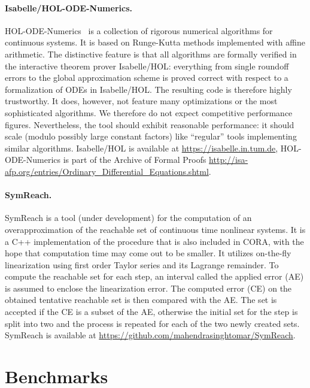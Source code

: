 \documentclass[EPiC]{easychair}
\begin{document}
\paragraph{Isabelle/HOL-ODE-Numerics.}
HOL-ODE-Numerics~\cite{Immler2015-TACAS,ODE-AFP} is a collection of rigorous numerical algorithms for continuous systems. It is based on Runge-Kutta methods implemented with affine arithmetic. 
The distinctive feature is that all algorithms are formally verified in the interactive
theorem prover Isabelle/HOL: everything from single roundoff errors to the global approximation
scheme is proved correct with respect to a formalization of ODEs in Isabelle/HOL.
The resulting code is therefore highly trustworthy.
It does, however, not feature many optimizations or the most sophisticated algorithms. We therefore
do not expect competitive performance figures. Nevertheless, the tool should exhibit reasonable
performance: it should scale (modulo possibly large constant factors) like ``regular'' tools
implementing similar algorithms. Isabelle/HOL is available at \url{https://isabelle.in.tum.de}, HOL-ODE-Numerics is part of the Archive of Formal Proofs \url{http://isa-afp.org/entries/Ordinary_Differential_Equations.shtml}.

\paragraph{SymReach.}
SymReach is a tool (under development) for the computation of an overapproximation of the reachable set of continuous time nonlinear systems. It is a C++ implementation of the procedure \cite{Althoff/2010/phd, Althoff2011a} that is also included in CORA, with the hope that computation time may come out to be smaller. It utilizes on-the-fly linearization using first order Taylor series and its Lagrange remainder. To compute the reachable set for each step, an interval called the applied error (AE) is assumed to enclose the linearization error. The computed error (CE) on the obtained tentative reachable set is then compared with the AE. The set is accepted if the CE is a subset of the AE, otherwise the initial set for the step is split into two and the process is repeated for each of the two newly created sets. SymReach is available at \url{https://github.com/mahendrasinghtomar/SymReach}.


\newpage

\section{Benchmarks}
\label{sect:benchmarks}
\end{document}
